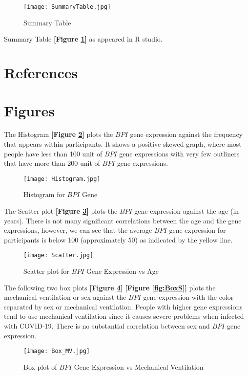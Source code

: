 \documentclass{article}
\begin{document}
\begin{figure}[h]
    \centering
    \texttt{[image: SummaryTable.jpg]}
    \caption{Summary Table}
    \label{fig:Summary}
\end{figure}


\newpage
Summary Table {\textbf{[Figure \ref{fig:Summary}]}} as appeared in R studio.

\section{References}




\newpage
\section{Figures}
The Histogram {\textbf{[Figure \ref{fig:Hist}]}} plots the $BPI$ gene expression against the frequency that appears within participants. It shows a positive skewed graph, where most people have less than 100 unit of $BPI$ gene expressions with very few outliners that have more than 200 unit of $BPI$ gene expressions.\\
\begin{figure}[h]
    \centering
    \texttt{[image: Histogram.jpg]}
    \caption{Histogram for $BPI$ Gene}
    \label{fig:Hist}
\end{figure}

\newpage
The Scatter plot {\textbf{[Figure \ref{fig:Scatter}]}} plots the $BPI$ gene expression against the age (in years). There is not many significant correlations between the age and the gene expressions, however, we can see that the average $BPI$ gene expression for participants is below 100 (approximately 50) as indicated by the yellow line.\\
\begin{figure}[h]
    \centering
    \texttt{[image: Scatter.jpg]}
    \caption{Scatter plot for $BPI$ Gene Expression vs Age}
    \label{fig:Scatter}
\end{figure}

\newpage
The following two box plots {\textbf{[Figure \ref{fig:BoxMV}]}} {\textbf{[Figure \ref{fig:BoxS}]}} plots the mechanical ventilation or sex against the $BPI$ gene expression with the color separated by sex or mechanical ventilation. People with higher gene expressions tend to use mechanical ventilation since it causes severe problems when infected with COVID-19. There is no substantial correlation between sex and $BPI$ gene expression.\\
\begin{figure}[h]
    \centering
    \texttt{[image: Box\_MV.jpg]}
    \caption{Box plot of $BPI$ Gene Expression vs Mechanical Ventilation}
    \label{fig:BoxMV}
\end{figure}
\end{document}
